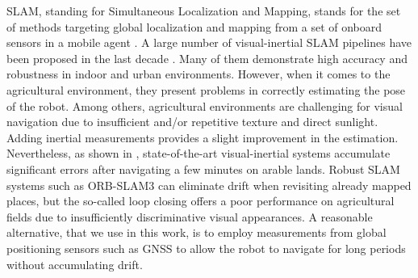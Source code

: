 SLAM, standing for Simultaneous Localization and Mapping, stands for the set of methods targeting global localization and mapping from a set of onboard sensors in a mobile agent \cite{cadena2016past}. A large number of visual-inertial SLAM pipelines have been proposed in the last decade \cite{mur2017visual,qin2018vins,campos2021orbslam3}. Many of them demonstrate high accuracy and robustness in indoor and urban environments. However, when it comes to the agricultural environment, they present problems in correctly estimating the pose of the robot. Among others, agricultural environments are challenging for visual navigation due to insufficient and/or repetitive texture and direct sunlight. Adding inertial measurements provides a slight improvement in the estimation. Nevertheless, as shown in \cite{cremona2022evaluation}, state-of-the-art visual-inertial systems accumulate significant errors after navigating a few minutes on arable lands. Robust SLAM systems such as ORB-SLAM3 \cite{campos2021orbslam3} can eliminate drift when revisiting already mapped places, but the so-called loop closing offers a poor performance on agricultural fields due to insufficiently discriminative visual appearances. A reasonable alternative, that we use in this work, is to employ measurements from global positioning sensors such as GNSS to allow the robot to navigate for long periods without accumulating drift.

